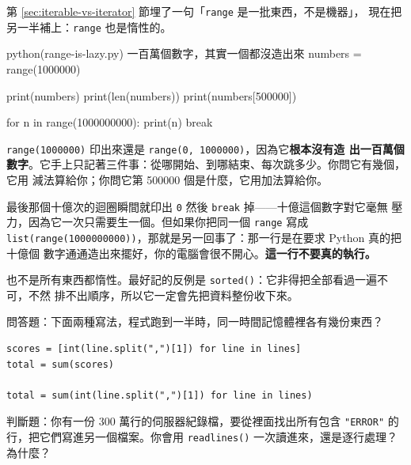 第 \ref{sec:iterable-vs-iterator} 節埋了一句「\texttt{range} 是一批東西，不是機器」，
現在把另一半補上：\texttt{range} 也是惰性的。

\begin{example}{python}{(range-is-lazy.py) 一百萬個數字，其實一個都沒造出來}
numbers = range(1000000)

print(numbers)
print(len(numbers))
print(numbers[500000])

for n in range(1000000000):
    print(n)
    break
\end{example}


\texttt{range(1000000)} 印出來還是 \texttt{range(0, 1000000)}，因為它\textbf{根本沒有造
出一百萬個數字}。它手上只記著三件事：從哪開始、到哪結束、每次跳多少。你問它有幾個，它用
減法算給你；你問它第 500000 個是什麼，它用加法算給你。

最後那個十億次的迴圈瞬間就印出 \texttt{0} 然後 \texttt{break} 掉——十億這個數字對它毫無
壓力，因為它一次只需要生一個。但如果你把同一個 \texttt{range} 寫成
\texttt{list(range(1000000000))}，那就是另一回事了：那一行是在要求 Python 真的把十億個
數字通通造出來擺好，你的電腦會很不開心。\textbf{這一行不要真的執行。}


也不是所有東西都惰性。最好記的反例是 \texttt{sorted()}：它非得把全部看過一遍不可，不然
排不出順序，所以它一定會先把資料整份收下來。

\begin{drills}[label=drills:lazy-memory]
\item 問答題：下面兩種寫法，程式跑到一半時，同一時間記憶體裡各有幾份東西？
\begin{verbatim}
scores = [int(line.split(",")[1]) for line in lines]
total = sum(scores)

total = sum(int(line.split(",")[1]) for line in lines)
\end{verbatim}
\item 判斷題：你有一份 300 萬行的伺服器紀錄檔，要從裡面找出所有包含 \texttt{"ERROR"}
的行，把它們寫進另一個檔案。你會用 \texttt{readlines()} 一次讀進來，還是逐行處理？為什麼？
\end{drills}

